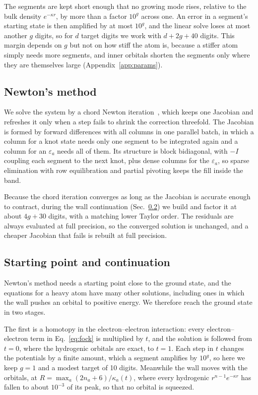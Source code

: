 \documentclass[aps,pra,reprint,superscriptaddress,amsmath,amssymb,longbibliography]{revtex4-2}
\begin{document}
The segments are kept short enough that no growing mode rises, relative to the bulk density $e^{-\kappa r}$, by more than a factor $10^g$ across one. An error in a segment's starting state is then amplified by at most $10^g$, and the linear solve loses at most another $g$ digits, so for $d$ target digits we work with $d+2g+40$ digits. This margin depends on $g$ but not on how stiff the atom is, because a stiffer atom simply needs more segments, and inner orbitals shorten the segments only where they are themselves large (Appendix~\ref{app:params}).

\subsection{Newton's method}\label{sec:newton}

We solve the system by a chord Newton iteration~\cite{Kelley1995}, which keeps one Jacobian and refreshes it only when a step fails to shrink the correction threefold. The Jacobian is formed by forward differences with all columns in one parallel batch, in which a column for a knot state needs only one segment to be integrated again and a column for an $\varepsilon_a$ needs all of them. Its structure is block bidiagonal, with $-I$ coupling each segment to the next knot, plus dense columns for the $\varepsilon_a$, so sparse elimination with row equilibration and partial pivoting keeps the fill inside the band.

Because the chord iteration converges as long as the Jacobian is accurate enough to contract, during the wall continuation (Sec.~\ref{sec:start}) we build and factor it at about $4g+30$ digits, with a matching lower Taylor order. The residuals are always evaluated at full precision, so the converged solution is unchanged, and a cheaper Jacobian that fails is rebuilt at full precision.

\subsection{Starting point and continuation}\label{sec:start}

Newton's method needs a starting point close to the ground state, and the equations for a heavy atom have many other solutions, including ones in which the wall pushes an orbital to positive energy. We therefore reach the ground state in two stages.

The first is a homotopy in the electron--electron interaction: every electron--electron term in Eq.~\eqref{eq:fock} is multiplied by $t$, and the solution is followed from $t=0$, where the hydrogenic orbitals are exact, to $t=1$. Each step in $t$ changes the potentials by a finite amount, which a segment amplifies by $10^g$, so here we keep $g=1$ and a modest target of 10 digits. Meanwhile the wall moves with the orbitals, at $R=\max_a(2n_a+6)/\kappa_a(t)$, where every hydrogenic $r^{n-1}e^{-\kappa r}$ has fallen to about $10^{-3}$ of its peak, so that no orbital is squeezed.
\end{document}
